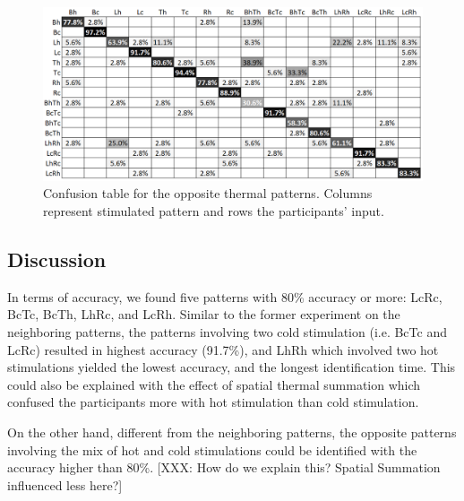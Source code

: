 \documentclass[preprint,12pt]{elsarticle}
\begin{document}
\begin{figure}[tp]
  \centering
  \includegraphics[width=0.9\columnwidth]{img/fig13.png}
  \caption{Confusion table for the opposite thermal patterns. Columns represent stimulated pattern and rows the participants' input.}
  \label{fig:13}
\end{figure}

\subsection{Discussion}
In terms of accuracy, we found five patterns with 80\% accuracy or more: LcRc, BcTc, BcTh, LhRc, and LcRh. Similar to the former experiment on the neighboring patterns, the patterns involving two cold stimulation (i.e. BcTc and LcRc) resulted in highest accuracy (91.7\%), and LhRh which involved two hot stimulations yielded the lowest accuracy, and the longest identification time. This could also be explained with the effect of spatial thermal summation which confused the participants more with hot stimulation than cold stimulation. 

On the other hand, different from the neighboring patterns, the opposite patterns involving the mix of hot and cold stimulations could be identified with the accuracy higher than 80\%. [XXX: How do we explain this? Spatial Summation influenced less here?]


\end{document}
